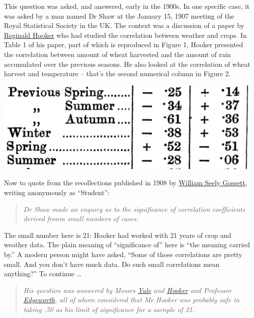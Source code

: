 \documentclass[]{book}
\begin{document}
This question was asked, and answered, early in the 1900s. In one specific case, it was asked by a man named Dr Shaw at the January 15, 1907 meeting of the Royal Statistical Society in the UK. The context was a discussion of a paper by \href{https://en.wikipedia.org/wiki/Reginald_Hawthorn_Hooker}{Reginald Hooker} who had studied the correlation between weather and crops. In Table 1 of his paper, part of which is reproduced in Figure 1, Hooker presented the correlation between amount of wheat harvested and the amount of rain accumulated over the previous seasons. He also looked at the correlation of wheat harvest and temperature -- that's the second numerical column in Figure 2.

\includegraphics[width=0.8\linewidth]{images/Hooker-correlations}

Now to quote from the recollections published in 1908 by \href{https://en.wikipedia.org/wiki/William_Sealy_Gosset}{William Seely Gossett}, writing anonymously as ``Student'':

\begin{quote}
\emph{Dr Shaw made an enquiry as to the significance of correlation coefficients derived fronm small numbers of cases.}
\end{quote}

The small number here is 21: Hooker had worked with 21 years of crop and weather data. The plain meaning of ``significance of'' here is ``the meaning carried by.'' A modern person might have asked, ``Some of those correlations are pretty small. And you don't have much data. Do such small correlations mean anything?'' To continue \ldots{}

\begin{quote}
\emph{His question was answered by Messrs \href{https://en.wikipedia.org/wiki/Udny_Yule}{Yule} and \href{https://en.wikipedia.org/wiki/Reginald_Hawthorn_Hooker}{Hooker} and Professor \href{https://en.wikipedia.org/wiki/Francis_Ysidro_Edgeworth}{Edgeworth}, all of whom considered that Mr Hooker was probably safe in taking .50 as his limit of significance for a sarnple of 21.}
\end{quote}
\end{document}
